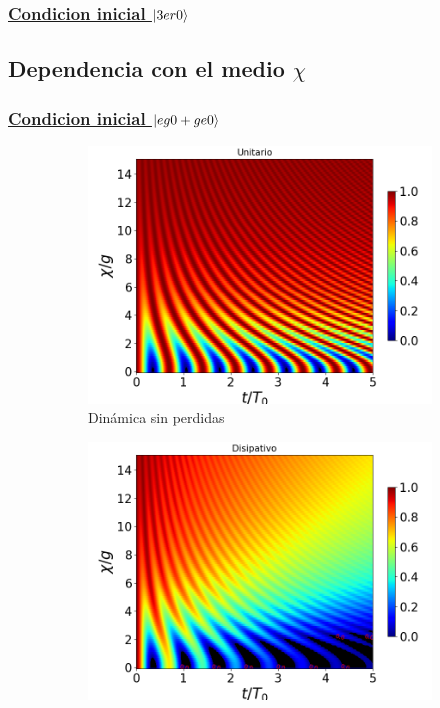 \subsubsection{\underline{Condicion inicial $\ket{3er0}$}}

\subsection{Dependencia con el medio $\chi$}
\subsubsection{\underline{Condicion inicial $\ket{eg0+ge0}$}}
\begin{figure}[h]
    \centering
    \begin{subfigure}{0.49\textwidth}
        \includegraphics[width=\textwidth]{figuras/ch4/concu/chi/eg0+ge0 d=0.0g k=0.0g J=0.0g gamma=0.25g concu chi uni.png}
        \caption{Dinámica sin perdidas}
        \label{fig4:concu x 0 uni}
    \end{subfigure}
    \hfill
    \begin{subfigure}{0.49\textwidth}
        \includegraphics[width=\textwidth]{figuras/ch4/concu/chi/eg0+ge0 d=0.0g k=0.0g J=0.0g gamma=0.25g concu chi dis.png}

\end{subfigure}
\end{figure}
